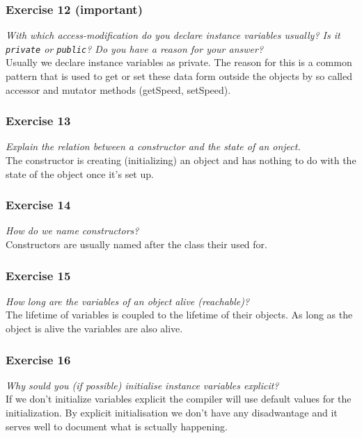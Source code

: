 \subsubsection*{Exercise 12 (important)}
\textit{With which access-modification do you declare instance variables
	usually? Is it \lstinline{private} or \lstinline{public}? Do you
	have a reason for your answer?}\\
Usually we declare instance variables as private. The reason for this is a 
common pattern that is used to get or set these data form outside the objects
by so called accessor and mutator methods (getSpeed, setSpeed).

\subsubsection*{Exercise 13}
\textit{Explain the relation between a constructor and the state of an 
	onject.}\\

	The constructor is creating (initializing) an object and has nothing
	to do with the state of the object once it's set up.

\subsubsection*{Exercise 14}
\textit{How do we name constructors?}\\

Constructors are usually named after the class their used for.

\subsubsection*{Exercise 15}
\textit{How long are the variables of an object alive (reachable)?}\\

The lifetime of variables is coupled to the lifetime of their objects.
As long as the object is alive the variables are also alive.

\subsubsection*{Exercise 16}
\textit{Why sould you (if possible) initialise instance variables explicit?}\\

If we don't initialize variables explicit the compiler will use default values
for the initialization. By explicit initialisation we don't have any 
disadwantage and it serves well to document what is sctually happening.

